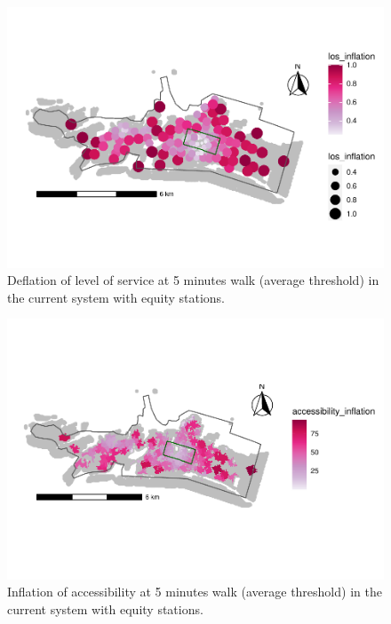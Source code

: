 \documentclass[]{elsarticle} %
\providecommand{\DIFaddbeginFL}{} %
\providecommand{\DIFaddendFL}{} %
\providecommand{\DIFdelbeginFL}{} %
\providecommand{\DIFdelendFL}{} %
\newcommand{\DIFscaledelfig}{0.5}
\newlength{\DIFdelgraphicswidth} %
\newlength{\DIFdelgraphicsheight} %
\newcommand{\DIFaddincludegraphics}[2][]{{\color{blue}\fbox{\DIFOincludegraphics[#1]{#2}}}} %
\newcommand{\DIFdelincludegraphics}[2][]{%
\sbox{\DIFdelgraphicsbox}{\DIFOincludegraphics[#1]{#2}}%
\settoboxwidth{\DIFdelgraphicswidth}{\DIFdelgraphicsbox} %
\settoboxtotalheight{\DIFdelgraphicsheight}{\DIFdelgraphicsbox} %
\scalebox{\DIFscaledelfig}{%
\parbox[b]{\DIFdelgraphicswidth}{\usebox{\DIFdelgraphicsbox}\\[-\baselineskip] \rule{\DIFdelgraphicswidth}{0em}}\llap{\resizebox{\DIFdelgraphicswidth}{\DIFdelgraphicsheight}{%
\setlength{\unitlength}{\DIFdelgraphicswidth}%
\begin{picture}(1,1)%
\thicklines\linethickness{2pt} %
{\color[rgb]{1,0,0}\put(0,0){\framebox(1,1){}}}%
{\color[rgb]{1,0,0}\put(0,0){\line( 1,1){1}}}%
{\color[rgb]{1,0,0}\put(0,1){\line(1,-1){1}}}%
\end{picture}%
}\hspace*{3pt}}} %
} %
\DeclareRobustCommand{\DIFaddbeginFL}{\DIFOaddbeginFL \let\includegraphics\DIFaddincludegraphics} %
\DeclareRobustCommand{\DIFaddendFL}{\DIFOaddendFL \let\includegraphics\DIFOincludegraphics} %
\DeclareRobustCommand{\DIFdelbeginFL}{\DIFOdelbeginFL \let\includegraphics\DIFdelincludegraphics} %
\DeclareRobustCommand{\DIFdelendFL}{\DIFOaddendFL \let\includegraphics\DIFOincludegraphics} %
\begin{document}
\begin{figure}

{\centering \DIFdelbeginFL %
\DIFdelendFL \DIFaddbeginFL \includegraphics[width=0.9\linewidth]{Bike-share-spatial-equity_files/figure-latex/figure-10-1} 
\DIFaddendFL 

}

\caption{Deflation of level of service at 5 minutes walk (average threshold) in the current system with equity stations.}\label{fig:figure-10}
\end{figure}

\begin{figure}

{\centering \DIFdelbeginFL %
\DIFdelendFL \DIFaddbeginFL \includegraphics[width=0.9\linewidth]{Bike-share-spatial-equity_files/figure-latex/figure-11-1} 
\DIFaddendFL 

}

\caption{Inflation of accessibility at 5 minutes walk (average threshold) in the current system with equity stations.}\label{fig:figure-11}
\end{figure}
\end{document}
